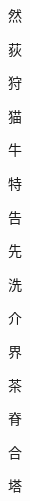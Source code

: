 \begin{spacing}{2.5}
{\Huge \begin{CJK}{UTF8}{min} 然\end{CJK}}\hspace{0.1cm}
{\Huge \begin{CJK}{UTF8}{min} 荻\end{CJK}}\hspace{0.1cm}
{\Huge \begin{CJK}{UTF8}{min} 狩\end{CJK}}\hspace{0.1cm}
{\Huge \begin{CJK}{UTF8}{min} 猫\end{CJK}}\hspace{0.1cm}
{\Huge \begin{CJK}{UTF8}{min} 牛\end{CJK}}\hspace{0.1cm}
{\Huge \begin{CJK}{UTF8}{min} 特\end{CJK}}\hspace{0.1cm}
{\Huge \begin{CJK}{UTF8}{min} 告\end{CJK}}\hspace{0.1cm}
{\Huge \begin{CJK}{UTF8}{min} 先\end{CJK}}\hspace{0.1cm}
{\Huge \begin{CJK}{UTF8}{min} 洗\end{CJK}}\hspace{0.1cm}
{\Huge \begin{CJK}{UTF8}{min} 介\end{CJK}}\hspace{0.1cm}
{\Huge \begin{CJK}{UTF8}{min} 界\end{CJK}}\hspace{0.1cm}
{\Huge \begin{CJK}{UTF8}{min} 茶\end{CJK}}\hspace{0.1cm}
{\Huge \begin{CJK}{UTF8}{min} 脊\end{CJK}}\hspace{0.1cm}
{\Huge \begin{CJK}{UTF8}{min} 合\end{CJK}}\hspace{0.1cm}
{\Huge \begin{CJK}{UTF8}{min} 塔\end{CJK}}\hspace{0.1cm}

\end{spacing}
